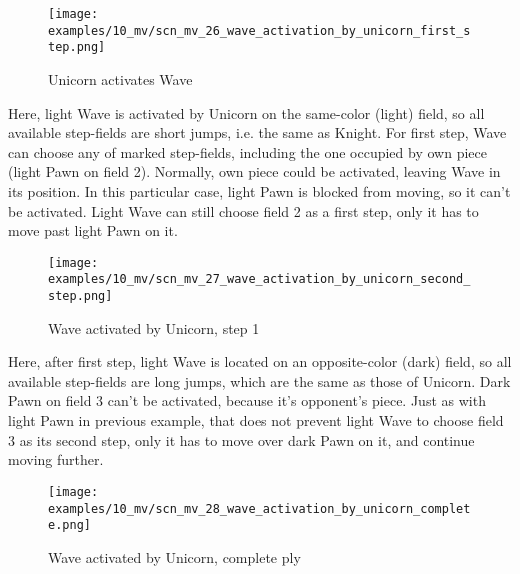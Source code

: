 \clearpage %

\vspace*{-2.1\baselineskip}
\noindent
\begin{figure}[!h]
\texttt{[image: examples/10\_mv/scn\_mv\_26\_wave\_activation\_by\_unicorn\_first\_step.png]}
\vspace*{-1.3\baselineskip}
\caption{Unicorn activates Wave}
\label{fig:scn_mv_26_wave_activation_by_unicorn_first_step}
\end{figure}

\vspace*{-0.3\baselineskip}
Here, light Wave is activated by Unicorn on the same-color (light) field, so all available
step-fields are short jumps, i.e. the same as Knight. For first step, Wave can choose any of
marked step-fields, including the one occupied by own piece (light Pawn on field 2). Normally,
own piece could be activated, leaving Wave in its position. In this particular case, light Pawn
is blocked from moving, so it can't be activated. Light Wave can still choose field 2 as a first
step, only it has to move past light Pawn on it.

\clearpage %

\vspace*{-2.1\baselineskip}
\noindent
\begin{figure}[!h]
\texttt{[image: examples/10\_mv/scn\_mv\_27\_wave\_activation\_by\_unicorn\_second\_step.png]}
\caption{Wave activated by Unicorn, step 1}
\label{fig:scn_mv_27_wave_activation_by_unicorn_second_step}
\end{figure}

Here, after first step, light Wave is located on an opposite-color (dark) field, so all available
step-fields are long jumps, which are the same as those of Unicorn. Dark Pawn on field 3 can't be
activated, because it's opponent's piece. Just as with light Pawn in previous example, that does
not prevent light Wave to choose field 3 as its second step, only it has to move over dark Pawn
on it, and continue moving further.

\clearpage %

\vspace*{-2.1\baselineskip}
\noindent
\begin{figure}[!h]
\texttt{[image: examples/10\_mv/scn\_mv\_28\_wave\_activation\_by\_unicorn\_complete.png]}
\caption{Wave activated by Unicorn, complete ply}
\label{fig:scn_mv_28_wave_activation_by_unicorn_complete}
\end{figure}

